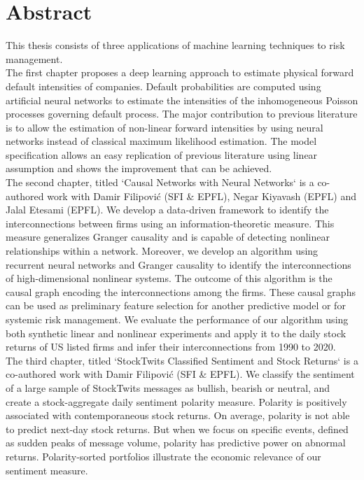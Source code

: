 

\cleardoublepage
\chapter*{Abstract}

This thesis consists of three applications of machine learning techniques to risk management. \\

The first chapter proposes a deep learning approach to estimate physical forward default intensities of companies. Default probabilities are computed using artificial neural networks to estimate the intensities of the inhomogeneous Poisson processes governing default process. The major contribution to previous literature is to allow the estimation of non-linear forward intensities by using neural networks instead of classical maximum likelihood estimation. The model specification allows an easy replication of previous literature using linear assumption and shows the improvement that can be achieved. \\

The second chapter, titled `Causal Networks with Neural Networks` is a co-authored work with Damir Filipović (SFI \& EPFL), Negar Kiyavash (EPFL) and Jalal Etesami (EPFL). We develop a data-driven framework to identify the interconnections between firms using an information-theoretic measure. 
This measure generalizes Granger causality and is capable of detecting nonlinear relationships within a network. 
Moreover, we develop an algorithm using recurrent neural networks and Granger causality to identify the interconnections of high-dimensional nonlinear systems. 
The outcome of this algorithm is the causal graph encoding the interconnections among the firms.
These causal graphs can be used as preliminary feature selection for another predictive model or for systemic risk management.
We evaluate the performance of our algorithm using both synthetic linear and nonlinear experiments and apply it to the daily stock returns of US listed firms and infer their interconnections from 1990 to 2020. \\

The third chapter, titled `StockTwits Classified Sentiment and Stock Returns` is a co-authored work with Damir Filipović (SFI \& EPFL). We classify the sentiment of a large sample of StockTwits messages as bullish, bearish or neutral, and create a stock-aggregate daily sentiment polarity measure. Polarity is positively associated with contemporaneous stock returns. On average, polarity is not able to predict next-day stock returns. But when we focus on specific events, defined as sudden peaks of message volume, polarity has predictive power on abnormal returns. Polarity-sorted portfolios illustrate the economic relevance of our sentiment measure. \\

